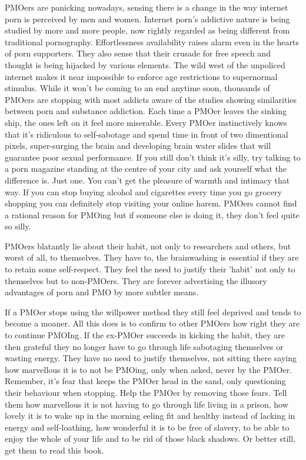 \documentclass[easypeasy.tex]{subfiles}
\begin{document}
PMOers are panicking nowadays, sensing there is a change in the way internet porn is perceived by men and women. Internet porn's addictive nature is being studied by more and more people, now rightly regarded as being different from traditional pornography. Effortlessness availability raises alarm even in the hearts of porn supporters. They also sense that their crusade for free speech and thought is being hijacked by various elements. The wild west of the unpoliced internet makes it near impossible to enforce age restrictions to supernormal stimulus. While it won't be coming to an end anytime soon, thousands of PMOers are stopping with most addicts aware of the studies showing similarities between porn and substance addiction. Each time a PMOer leaves the sinking ship, the ones left on it feel more miserable. Every PMOer instinctively knows that it's ridiculous to self-sabotage and spend time in front of two dimentional pixels, super-surging the brain and developing brain water slides that will guarantee poor sexual performance. If you still don't think it's silly, try talking to a porn magazine standing at the centre of your city and ask yourself what the difference is. Just one. You can't get the pleasure of warmth and intimacy that way. If you can stop buying alcohol and cigarettes every time you go grocery shopping you can definitely stop visiting your online harem. PMOers cannot find a rational reason for PMOing but if someone else is doing it, they don't feel quite so silly.

PMOers blatantly lie about their habit, not only to researchers and others, but worst of all, to themselves. They have to, the brainwashing is essential if they are to retain some self-respect. They feel the need to justify their 'habit' not only to themselves but to non-PMOers. They are forever advertising the illusory advantages of porn and PMO by more subtler means.

If a PMOer stops using the willpower method they still feel deprived and tends to become a moaner. All this does is to confirm to other PMOers how right they are to continue PMOIng. If the ex-PMOer succeeds in kicking the habit, they are then grateful they no longer have to go through life sabotaging themselves or wasting energy. They have no need to justify themselves, not sitting there saying how marvellous it is to not be PMOing, only when asked, never by the PMOer. Remember, it's fear that keeps the PMOer head in the sand, only questioning their behaviour when stopping. Help the PMOer by removing those fears. Tell them how marvellous it is not having to go through life living in a prison, how lovely it is to wake up in the morning eeling fit and healthy instead of lacking in energy and self-loathing, how wonderful it is to be free of slavery, to be able to enjoy the whole of your life and to be rid of those black shadows. Or better still, get them to read this book.
\end{document}
